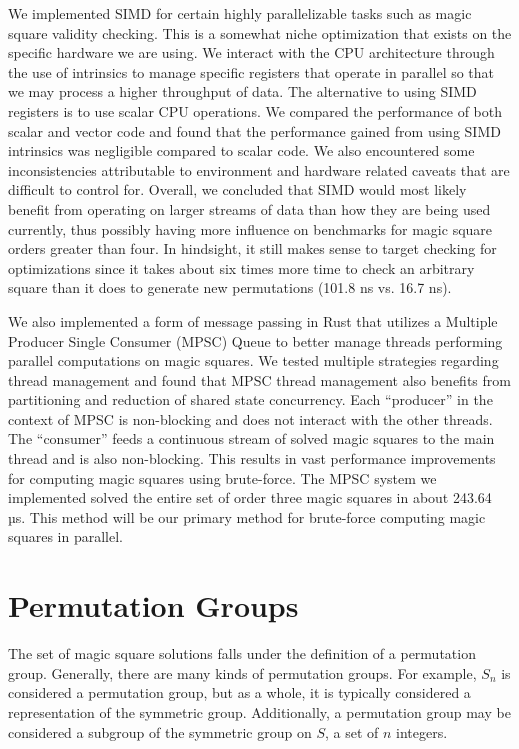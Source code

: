 \documentclass{rhumj_new}
\begin{document}
We implemented SIMD for certain highly parallelizable tasks such as magic square validity checking.
This is a somewhat niche optimization that exists on the specific hardware we are using. We
interact with the CPU architecture through the use of intrinsics to manage specific registers that
operate in parallel so that we may process a higher throughput of data. The alternative to using
SIMD registers is to use scalar CPU operations. We compared the performance of both scalar and
vector code and found that the performance gained from using SIMD intrinsics was negligible
compared to scalar code. We also encountered some inconsistencies attributable to environment and
hardware related caveats that are difficult to control for. Overall, we concluded that SIMD would
most likely benefit from operating on larger streams of data than how they are being used
currently, thus possibly having more influence on benchmarks for magic square orders greater than
four. In hindsight, it still makes sense to target checking for optimizations since it takes about
six times more time to check an arbitrary square than it does to generate new permutations (101.8
ns vs. 16.7 ns).

We also implemented a form of message passing in Rust that utilizes a Multiple Producer Single
Consumer (MPSC) Queue to better manage threads performing parallel computations on magic squares.
We tested multiple strategies regarding thread management and found that MPSC thread management
also benefits from partitioning and reduction of shared state concurrency. Each ``producer'' in the
context of MPSC is non-blocking and does not interact with the other threads. The ``consumer''
feeds a continuous stream of solved magic squares to the main thread and is also non-blocking. This
results in vast performance improvements for computing magic squares using brute-force. The MPSC
system we implemented solved the entire set of order three magic squares in about 243.64 µs. This
method will be our primary method for brute-force computing magic squares in parallel.

\section{Permutation Groups}

The set of magic square solutions falls under the definition of a permutation group. Generally,
there are many kinds of permutation groups. For example, $S_n$ is considered a permutation group,
but as a whole, it is typically considered a representation of the symmetric group. Additionally, a
permutation group may be considered a subgroup of the symmetric group on $S$, a set of $n$
integers\cite{Whitelaw}.
\end{document}
